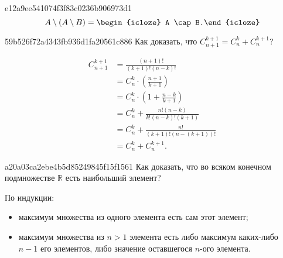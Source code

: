     \begin{note}{e12a9ee541074f3f83c0236b906973d1}
        \[
            A \setminus (A \setminus B) = \begin{icloze}{1}A \cap B.\end{icloze}
        \]
    \end{note}

    \begin{note}{59b526f72a4343fb936d1fa20561c886}
        Как доказать, что \; \( C_{n + 1}^{k + 1} = C_n^k + C_n^{k + 1} \)?
        \begin{cloze}{1}
            \begin{align*}
                C_{n + 1}^{k + 1} &= \frac{(n + 1)!}{(k + 1)!(n - k)!} \\
                &= C_n^k \cdot \left( \frac{n + 1}{k + 1}  \right) \\
                &= C_n^k \cdot \left( 1 + \frac{n - k}{k + 1}  \right) \\
                &= C_n^k + \frac{n! (n - k)}{k!(n - k)!(k + 1)} \\
                &= C_n^k + \frac{n!}{(k + 1)!(n - (k + 1))!} \\
                &= C_n^k + C_n^{k + 1}.
            \end{align*}
        \end{cloze}
    \end{note}

    \begin{note}{a20a03ca2ebe4b5d85249845f15f1561}
        Как доказать, что во всяком конечном подмножестве \(\mathbb{R}\) есть
        наибольший элемент?

        \begin{cloze}{1}
            По индукции:
            \begin{itemize}
                \item максимум множества из одного элемента есть сам этот
                    элемент;
                \item максимум множества из \( n > 1 \) элемента есть либо
                    максимум каких-либо \( n - 1 \) его элементов, либо значение
                    оставшегося \( n \)-ого элемента.
            \end{itemize}
        \end{cloze}
    \end{note}

